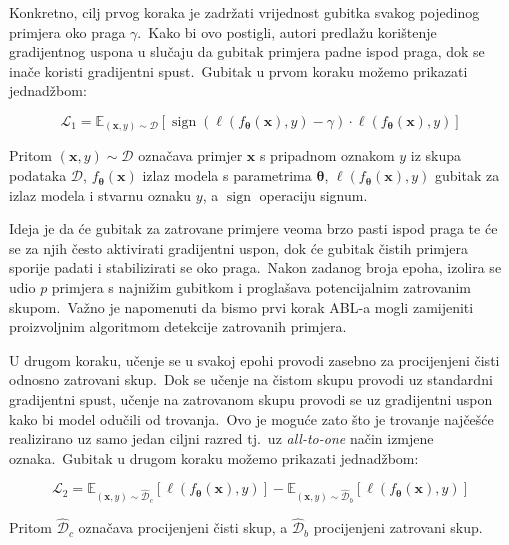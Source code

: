 \documentclass[diplomskirad]{fer}
\begin{document}
Konkretno, cilj prvog koraka je zadržati vrijednost gubitka svakog pojedinog primjera oko praga $\gamma$.\
Kako bi ovo postigli, autori predlažu korištenje gradijentnog uspona u slučaju da gubitak primjera padne ispod praga, dok se inače koristi gradijentni spust.\ Gubitak u prvom koraku možemo prikazati jednadžbom:

\begin{equation}
  \mathcal{L}_1 = \mathbb{E}_{(\bm{x}, y) \sim \mathcal{D}} \left[ \operatorname{sign} \left( \ell(f_{\bm{\theta}}(\bm{x}), y) - \gamma \right) \cdot \ell(f_{\bm{\theta}}(\bm{x}), y) \right]
  \label{eq:abl1}
\end{equation}

Pritom $(\bm{x}, y) \sim \mathcal{D}$ označava primjer $\bm{x}$ s pripadnom oznakom $y$ iz skupa podataka $\mathcal{D}$, $f_{\bm{\theta}}(\bm{x})$ izlaz modela s parametrima $\bm{\theta}$, $\ell(f_{\bm{\theta}}(\bm{x}), y)$ gubitak za izlaz modela i stvarnu oznaku $y$, a $\operatorname{sign}$ operaciju signum.\ 
  
Ideja je da će gubitak za zatrovane primjere veoma brzo pasti ispod praga te će se za njih često aktivirati gradijentni uspon, dok će gubitak čistih primjera sporije padati i stabilizirati se oko praga.\ 
Nakon zadanog broja epoha, izolira se udio $p$ primjera s najnižim gubitkom i proglašava potencijalnim zatrovanim skupom.\ Važno je napomenuti da bismo prvi korak ABL-a mogli zamijeniti proizvoljnim algoritmom detekcije zatrovanih primjera.\ 
  
U drugom koraku, učenje se u svakoj epohi provodi zasebno za procijenjeni čisti odnosno zatrovani skup.\ 
Dok se učenje na čistom skupu provodi uz standardni gradijentni spust, učenje na zatrovanom skupu provodi se uz gradijentni uspon kako bi model odučili od trovanja.\ 
Ovo je moguće zato što je trovanje najčešće realizirano uz samo jedan ciljni razred tj.\ uz \textit{all-to-one} način izmjene oznaka.\ Gubitak u drugom koraku možemo prikazati jednadžbom:

\begin{equation}
  \mathcal{L}_2 = \mathbb{E}_{(\bm{x}, y) \sim \hat{\mathcal{D}}_c} \left[ \ell(f_{\bm{\theta}}(\bm{x}), y) \right] - \mathbb{E}_{(\bm{x}, y) \sim \hat{\mathcal{D}}_b} \left[ \ell(f_{\bm{\theta}}(\bm{x}), y) \right]
  \label{eq:abl2}
\end{equation}

Pritom $\hat{\mathcal{D}}_c$ označava procijenjeni čisti skup, a $\hat{\mathcal{D}}_b$ procijenjeni zatrovani skup.\
\end{document}
